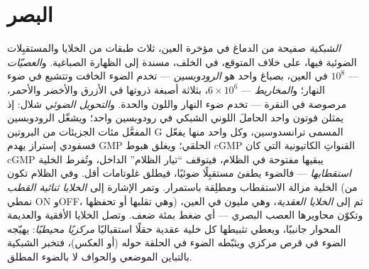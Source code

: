 \section{البصر}

\begin{definition}[الشبكية]\label{def:b3:sensory-systems:retina}
\emph{الشبكية} صفيحة من الدماغ في مؤخرة العين، ثلاث طبقات من
الخلايا والمستقبِلات الضوئية فيها، على خلاف المتوقع، في
الخلف، مسندة إلى الظهارة الصباغية. و\emph{العصيّات} ---
$10^{8}$ في العين، بصباغ واحد هو \emph{الرودوبسين} --- تخدم
الضوء الخافت وتتشبع في ضوء النهار؛ و\emph{المخاريط} ---
$6\times 10^{6}$، بثلاثة أصبغة ذروتها في الأزرق والأخضر
والأحمر، مرصوصة في النقرة --- تخدم ضوء النهار واللون
والحدة. و\emph{التحويل الضوئي} شلال: إذ يمثلن فوتون واحد
الحاملَ اللوني الشبكي في رودوبسين واحد؛ ويشغّل الرودوبسين
المفعَّل مئات الجزيئات من البروتين G المسمى ترانسدوسين، وكل
واحد منها يفعّل فسفودي إستراز يهدم GMP الحلقي؛ ويغلق هبوط
cGMP القنواتِ الكاتيونية التي كان cGMP يبقيها مفتوحة في
الظلام، فيتوقف ``تيار الظلام'' الداخل، وتُفرط الخلية
\emph{استقطابها} --- فالضوء يطفئ مستقبِلًا ضوئيًا، فيطلق غلوتامات
أقل. وفي الظلام تكون الخلية مزالة الاستقطاب ومطلِقة
باستمرار. وتمر الإشارة إلى \emph{الخلايا ثنائية القطب} (من
نمطي ON وOFF، وهي تقلبها أو تحفظها) ثم إلى \emph{الخلايا
العقدية}، وهي مليون في العين، وتكوّن محاويرها العصب البصري
--- أي ضغط بمئة ضعف. وتصل الخلايا الأفقية والعديمة المحوار
جانبيًا، ويعطي تثبيطها كل خلية عقدية حقلًا استقباليًا
\emph{مركزيًا محيطيًا}: يهيّجه الضوء في قرص مركزي ويثبّطه
الضوء في الحلقة حوله (أو العكس)، فتخبر الشبكية بالتباين
الموضعي والحواف لا بالضوء المطلق.
\end{definition}

